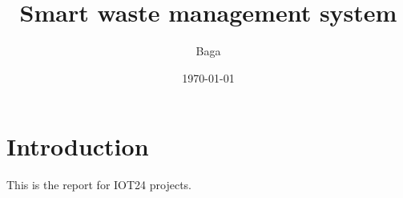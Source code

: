 \documentclass{article}
\title{Smart waste management system}
\author{Baga}
\date{\today}
\begin{document}
\maketitle

\section{Introduction}
This is the report for IOT24 projects.
\end{document}
